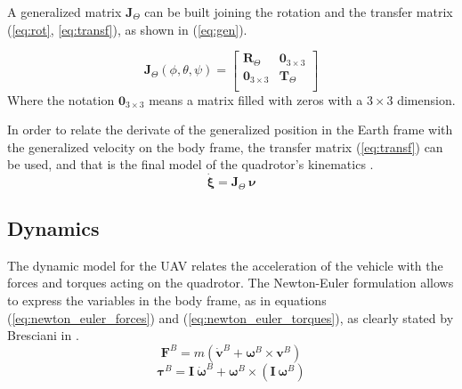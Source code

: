 \documentclass[journal]{IEEEtran}
\begin{document}
	A generalized matrix $\bm{J}_\Theta$ can be built joining the rotation and the transfer matrix (\ref{eq:rot}, \ref{eq:transf}), as shown in (\ref{eq:gen}).
	
	\begin{equation} \label{eq:gen}
	\bm{J}_\Theta (\phi,\theta, \psi)= \left[ {\begin{array}{cc}
		\bm{R}_\Theta &  \mathbf{0}_{3\times 3} \\
		\mathbf{0}_{3\times 3} & \bm{T}_\Theta \\
		\end{array} } \right]
	\end{equation}  
	Where the notation $\mathbf{0}_{3\times 3}$ means a matrix filled with zeros with a $3 \times 3$ dimension.
	
	In order to relate the derivate of the generalized position in the Earth frame with the generalized velocity on the body frame, the transfer matrix (\ref{eq:transf}) can be used, and that is the final model of the quadrotor's kinematics \cite{SabatinoFrancesco2015Qcmn, mod_control_bresciani}.
	\begin{equation} \label{eq:derivpos_earth_body}
	\bm{\dot \xi} %
	= \bm{J}_\Theta \ \bm{\nu}
	\end{equation}
	
	\subsection{Dynamics}
	The dynamic model for the UAV relates the acceleration of the vehicle with the forces and torques acting on the quadrotor. The Newton-Euler formulation allows to express the variables in the body frame, as in equations (\ref{eq:newton_euler_forces}) and (\ref{eq:newton_euler_torques}), as clearly stated by Bresciani in \cite{mod_control_bresciani}.
	\begin{equation} \label{eq:newton_euler_forces}
	\bm{F}^B = m ( \bm{\dot v}^B + \bm{\omega}^B \times \bm{v}^B)
	\end{equation}
	\begin{equation} \label{eq:newton_euler_torques}
	\bm{\tau}^B = \bm{I} \ \bm{\dot \omega}^B + \bm{\omega}^B \times (\bm{I} \ \bm{\omega}^B)
	\end{equation}
	
\end{document}
